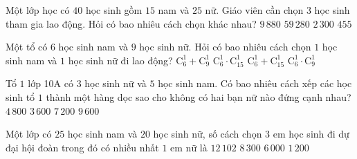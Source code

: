 \begin{ex}%
	Một lớp học có $40$ học sinh gồm $15$ nam và  $25$ nữ. Giáo viên cần chọn $3$ học sinh tham gia lao động. Hỏi có bao nhiêu cách chọn khác nhau?
	\choice 
		 {\True $9\,880$}
		{$59\,280$} 
		 {$2\,300$}
		 {$455$}
\end{ex}

\begin{ex}%
	Một tổ có $6$ học sinh nam và $9$  học sinh nữ. Hỏi có bao nhiêu cách chọn $1$ học sinh nam và $1$ học sinh nữ đi lao động?
	 \choice
		 {$\mathrm{C}_6^1+\mathrm{C}_9^1$}
		 {$\mathrm{C}_6^1\cdot\mathrm{C}_{15}^1$}
		 {$\mathrm{C}_6^1+\mathrm{C}_{15}^1$}
		{\True  $\mathrm{C}_6^1\cdot \mathrm{C}_9^1$}
\end{ex}

\begin{ex}%
	Tổ $1$ lớp 10A có $3$ học sinh nữ và $5$ học sinh nam. Có bao nhiêu  cách xếp các học sinh tổ $1$ thành một hàng dọc sao cho không có hai bạn nữ nào đứng cạnh nhau?
	 \choice
		 {$4\,800$}
		 {$3\,600$}
		 {\True $7\,200$}
		 {$9\,600$}
\end{ex}

\begin{ex}%
	Một lớp có $25$ học sinh nam và $20$ học sinh  nữ, số cách chọn $3$ em học sinh đi dự đại hội đoàn trong đó có nhiều nhất $1$ em nữ là
	 \choice
		{$12\,102$} 
		{\True $8\,300$} 
		 {$6\,000$}
		 {$1\,200$}
\end{ex}


